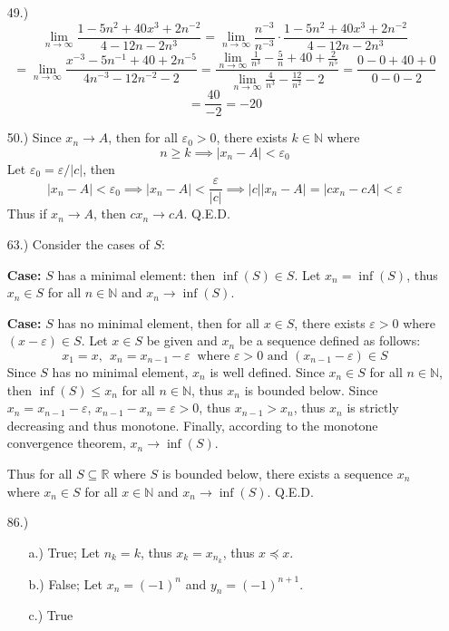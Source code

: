 \documentclass[12pt]{article}
\newcommand{\vertb}[1]{\left\vert#1\right\vert}
\newcommand{\e}{\varepsilon}
\newcommand{\lm}[1]{\displaystyle\lim_{#1}}
\begin{document}
\begin{itemize}
    \item [49.)]
    \[\lm{n\to\infty}\frac{1-5n^2+40x^3+2n^{-2}}{4-12n-2n^3}=\lm{n\to\infty}\frac{n^{-3}}{n^{-3}}\cdot\frac{1-5n^2+40x^3+2n^{-2}}{4-12n-2n^3}\]
    \[=\lm{n\to\infty}\frac{x^{-3}-5n^{-1}+40+2n^{-5}}{4n^{-3}-12n^{-2}-2}=\frac{\lm{n\to\infty}\frac{1}{n^3}-\frac{5}{n}+40+\frac{2}{n^5}}{\lm{n\to\infty}\frac{4}{n^3}-\frac{12}{n^2}-2}=\frac{0-0+40+0}{0-0-2}\]
    \[=\frac{40}{-2}=-20\]

    \item [50.)] Since $x_n\to A$, then for all $\e_0>0$, there exists $k\in\mathbb{N}$ where
    \[n\geq k\implies\vertb{x_n-A}<\e_0\]
    Let $\e_0=\e/\vertb{c}$, then
    \[\vertb{x_n-A}<\e_0\implies\vertb{x_n-A}<\frac{\e}{\vertb{c}}\implies\vertb{c}\vertb{x_n-A}=\vertb{cx_n-cA}<\e\]
    Thus if $x_n\to A$, then $cx_n\to cA$. Q.E.D.
    
    \item [63.)] Consider the cases of $S$:

    \textbf{Case:} $S$ has a minimal element: then $\inf(S)\in S$. Let $x_n=\inf(S)$, thus $x_n\in S$ for all $n\in\mathbb{N}$ and $x_n\to\inf(S)$.

    \textbf{Case:} $S$ has no minimal element, then for all $x\in S$, there exists $\e>0$ where $(x-\e)\in S$. Let $x\in S$ be given and $x_n$ be a sequence defined as follows:
    \[x_1=x,\ \ x_n=x_{n-1}-\e\ \text{ where }\e>0\text{ and }(x_{n-1}-\e)\in S\]
    Since $S$ has no minimal element, $x_n$ is well defined. Since $x_n\in S$ for all $n\in\mathbb N$, then $\inf(S)\leq x_n$ for all $n\in\mathbb{N}$, thus $x_n$ is bounded below. Since $x_n=x_{n-1}-\e$, $x_{n-1}-x_n=\e>0$, thus $x_{n-1}>x_n$, thus $x_n$ is strictly decreasing and thus monotone. Finally, according to the monotone convergence theorem, $x_n\to\inf(S)$.

    Thus for all $S\subseteq\mathbb R$ where $S$ is bounded below, there exists a sequence $x_n$ where $x_n\in S$ for all $x\in\mathbb N$ and $x_n\to\inf(S)$. Q.E.D.

    \item [86.)] \begin{itemize}
        \item [a.)] True; Let $n_k=k$, thus $x_k=x_{n_k}$, thus $x\preceq x$.

        \item [b.)] False; Let $x_n=(-1)^n$ and $y_n=(-1)^{n+1}$. 

        \item [c.)] True


\end{itemize}
\end{itemize}
\end{document}

